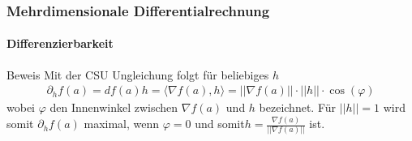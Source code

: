 \documentclass{beamer}
\begin{document}
\begin{frame}
    \frametitle{Mehrdimensionale Differentialrechnung}
\framesubtitle{Differenzierbarkeit}
    \begin{block}{Beweis}
Mit der CSU Ungleichung folgt für beliebiges $h$ 
\begin{align*}
\partial_h f(a) = df(a) h = \langle \nabla f(a) , h \rangle = || \nabla f(a)||  \cdot ||h|| \cdot \cos(\varphi) 
\end{align*} 
wobei $\varphi$ den Innenwinkel zwischen $\nabla f(a)$ und $h$ bezeichnet. Für $||h|| = 1$ wird somit $\partial_h f(a) $ maximal, wenn $\varphi = 0$ und somit$h =  \frac{\nabla f(a)}{||\nabla f(a)||}$ ist.
\end{block}

 \end{frame}
\end{document}
